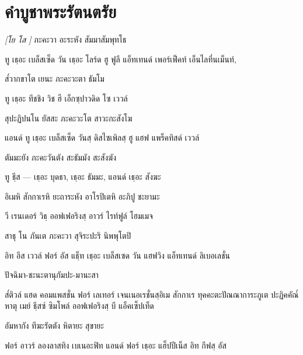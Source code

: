 \chapter{คําบูชาพระรัตนตรัย}

\textit{[โย โส ]} ภะคะวา อะระหัง สัมมาสัมพุทโธ

\begin{english}
ทู เธฺอะ เบล็สเซ็ด   วัน เธฺอะ โลร์ด ฮู ฟูลี แอ็ทเทนด์ เพอร์เฟ็คท์ เอ็นไลทึ่นเม็นท์,
\end{english}

ส๎วากขาโต เยนะ ภะคะวะตา ธัมโม

\begin{english}
ทู เธฺอะ ทีชชิง วิช ฮี เอ็กซฺปาวดิด โซ เววล์
\end{english}

สุปะฏิปนโน  ยัสสะ ภะคะวะโต สาวะกะสังโฆ

\begin{english}
แอนด์ ทู เธฺอะ เบล็สเซ็ด  วันสฺ ดิสไซเพิลสฺ ฮู แฮฟ แพร็คทิสด์ เววล์
\end{english}

ตัมมะยัง ภะคะวันตัง สะธัมมัง สะสังฆัง

\begin{english}
ทู ธีฺส — เธฺอะ บุดธา, เธฺอะ ธัมมะ, แอนด์ เธฺอะ สังฆะ
\end{english}

อิเมหิ สักกาเรหิ ยะถาระหัง อาโรปิเตหิ อะภิปู ชะยามะ

\begin{english}
วี เรนเดอร์ วิธฺ ออฟเฟอริงสฺ อาวร์ ไรท์ฟูล์ โฮมเมจ
\end{english}

สาธุ โน ภันเต ภะคะวา สุจิระปะริ นิพพุโตปิ

\begin{english}
อิท อีส เววล์ ฟอร์ อัส แธฺ็ท เธฺอะ เบล็สเซด วัน แฮฟวิง แอ็ทเทนด์ ลิเบอเลชั่น
\end{english}

ปัจฉิมา-ชะนะตานุกัมปะ-มานะสา

\begin{english}
ส๎ติวล์ แฮด คอมแพสชั่น ฟอร์ เลเทอร์ เจนเนอเรชั่นสฺอิเม สักกาเร ทุคคะตะปัณณาการะภูเต ปะฏิคคัณ๎หาตุ
เมย์ ธีฺสซ์ ซิมโพล์ ออฟเฟอริงสฺ บี แอ็คเซ็ปเท็ด
\end{english}

อัมหากัง ทีฆะรัตตัง หิตายะ สุขายะ

\begin{english}
	ฟอร์ อาวร์ ลองลาสทิง เบเนอะฟิท แอนด์ ฟอร์ เธฺอะ
	แฮ็ปปีเน็ส อิท กีฟสฺ อัส
\end{english}

